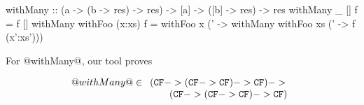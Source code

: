 \begin{code}
withMany :: (a -> (b -> res) -> res)
         -> [a] -> ([b] -> res) -> res
withMany _       []     f = f []
withMany withFoo (x:xs) f = withFoo x (\x' ->
      withMany withFoo xs (\xs' -> f (x':xs')))
\end{code}

For @withMany@, our tool proves

\[ @withMany@ \in \begin{array}[t]{l} ({\tt CF} -> ({\tt CF} -> {\tt CF}) -> {\tt CF}) -> \\
                                      \quad\quad ({\tt CF} -> ({\tt CF} -> {\tt CF}) -> {\tt CF})
                  \end{array}\] 

\begin{comment}
\subsection{A small case-study about invariants}

We consider a somewhat non-standard way of expressing propositional
logic formulae:

\begin{code}
data Formula = And [Formula]
             | Or  [Formula]
             | Neg (Formula)
             | Implies (Formula) (Formula)
             | Lit Bool
\end{code}

One invariant that we are particularly interested in is that we
should never have two consecutive negations, and that the lists of
@And@ and @Or@ are of length $\ge$ 2. We can express that as an ordinary
Haskell predicate:

\begin{code}
invariant :: Formula -> Bool
invariant f = case f of
  And xs      -> properList xs && all invariant xs
  Or xs       -> properList xs && all invariant xs
  Neg Neg{}   -> False
  Neg x       -> invariant x
  Implies x y -> invariant x && invariant y
  Lit x       -> True

properList :: [a] -> Bool
properList []  = False
properList [_] = False
properList _   = True
\end{code}

Now, we have a recursive function that negates formula:

\begin{code}
neg :: Formula -> Formula
neg (Neg f)         = f
neg (And fs)        = Or (map neg fs)
neg (Or fs)         = And (map neg fs)
neg (Implies f1 f2) = neg f2 `Implies` neg f1
neg (Lit b)         = Lit b
\end{code}


\end{comment}
